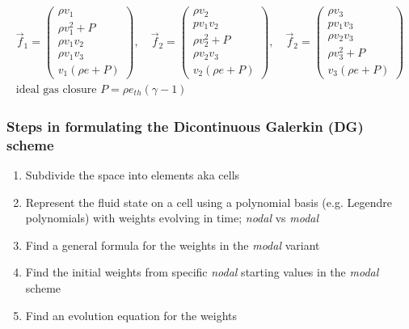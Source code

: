\begin{equation}
    \begin{gathered}
        \vec{f}_1=\left(\begin{array}{c}
            \rho v_1 \\
            \rho v_1^2+P \\
            \rho v_1 v_2 \\
            \rho v_1 v_3 \\
            v_1(\rho e+P)
            \end{array}\right), \quad \vec{f}_2=\left(\begin{array}{c}
            \rho v_2 \\
            p v_1 v_2 \\
            \rho v_2^2+P \\
            \rho v_2 v_3 \\
            v_2(\rho e+P)
            \end{array}\right), \quad \vec{f}_2=\left(\begin{array}{c}
            \rho v_3 \\
            p v_1 v_3 \\
            \rho v_2 v_3 \\
            \rho v_3^2+P \\
            v_3(\rho e+P)
            \end{array}\right) \\
            \text{ideal gas closure } P = \rho e_{th} (\gamma - 1)
    \end{gathered}
\end{equation}


\subsubsection{Steps in formulating the Dicontinuous Galerkin (DG) scheme}
\begin{enumerate}
    \item Subdivide the space into elements aka cells
    \item Represent the fluid state on a cell using a polynomial basis (e.g. Legendre polynomials) with weights evolving in time; \textit{nodal} vs \textit{modal}
    \item Find a general formula for the weights in the \textit{modal} variant
    \item Find the initial weights from specific \textit{nodal} starting values in the \textit{modal} scheme
    \item Find an evolution equation for the weights
\end{enumerate}

